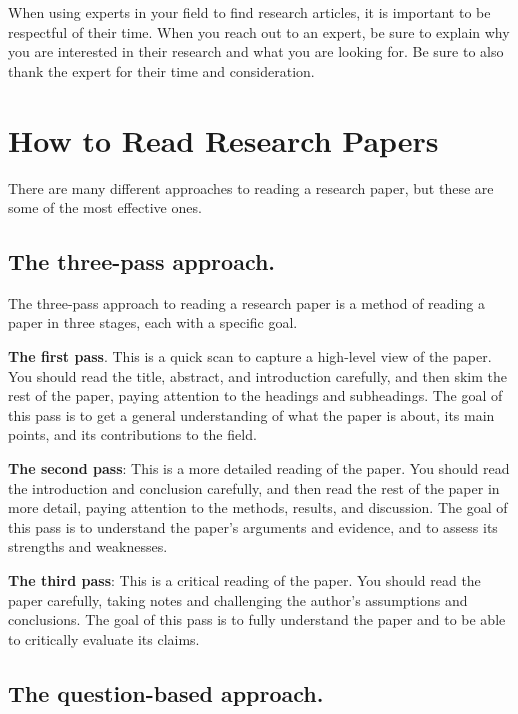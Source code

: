 \documentclass[
  b5paper]{book}
\begin{document}
When using experts in your field to find research articles, it is important to be respectful of their time. When you reach out to an expert, be sure to explain why you are interested in their research and what you are looking for. Be sure to also thank the expert for their time and consideration.

\hypertarget{read}{%
\section{How to Read Research Papers}\label{read}}

There are many different approaches to reading a research paper, but these are some of the most effective ones.

\hypertarget{the-three-pass-approach.}{%
\subsection*{The three-pass approach.}\label{the-three-pass-approach.}}

The three-pass approach to reading a research paper is a method of reading a paper in three stages, each with a specific goal.

\textbf{The first pass}. This is a quick scan to capture a high-level view of the paper. You should read the title, abstract, and introduction carefully, and then skim the rest of the paper, paying attention to the headings and subheadings. The goal of this pass is to get a general understanding of what the paper is about, its main points, and its contributions to the field.

\textbf{The second pass}: This is a more detailed reading of the paper. You should read the introduction and conclusion carefully, and then read the rest of the paper in more detail, paying attention to the methods, results, and discussion. The goal of this pass is to understand the paper's arguments and evidence, and to assess its strengths and weaknesses.

\textbf{The third pass}: This is a critical reading of the paper. You should read the paper carefully, taking notes and challenging the author's assumptions and conclusions. The goal of this pass is to fully understand the paper and to be able to critically evaluate its claims.

\hypertarget{the-question-based-approach.}{%
\subsection*{The question-based approach.}\label{the-question-based-approach.}}
\end{document}
